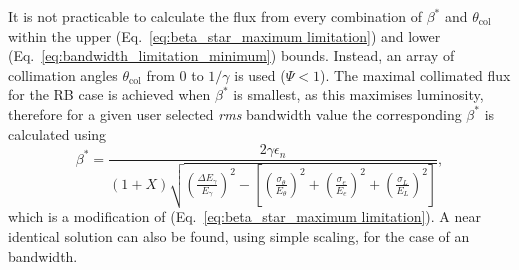 \documentclass[../main.tex]{subfiles}
\begin{document}
It is not practicable to calculate the flux from every combination of $\beta^{*}$ and $\theta_{\mathrm{col}}$ within the upper (Eq.~\ref{eq:beta_star_maximum limitation}) and lower (Eq.~\ref{eq:bandwidth_limitation_minimum}) bounds. Instead, an array of collimation angles $\theta_{\mathrm{col}}$ from 0 to $1/\gamma$ is used ($\Psi<1$). The maximal collimated flux for the RB case is achieved when $\beta^{*}$ is smallest, as this maximises luminosity, therefore for a given user selected \textit{rms} bandwidth value the corresponding $\beta^{*}$ is calculated using
\begin{equation}
\beta^{*} = \frac{2\gamma\epsilon_{n}}{\left(1+X\right)\sqrt{\left(\frac{\Delta E_{\gamma}}{E_{\gamma}}\right)^{2}-\left[\left(\frac{\sigma_{\theta}}{E_{\theta}}\right)^{2}+\left(\frac{\sigma_{e}}{E_{e}}\right)^{2}+\left(\frac{\sigma_{L}}{E_{L}}\right)^{2}\right]}},
\label{eq:beta_star_round_beam}
\end{equation}
which is a modification of (Eq.~\ref{eq:beta_star_maximum limitation}). A near identical solution can also be found, using simple scaling, for the case of an  bandwidth. 
\end{document}
